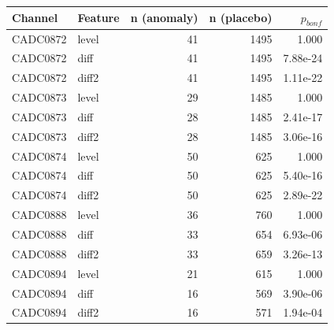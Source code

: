 \begin{tabular}{llrrr}
\toprule
Channel & Feature & n (anomaly) & n (placebo) & $p_{bonf}$ \\
\midrule
CADC0872 & level & 41 & 1495 & 1.000 \\
CADC0872 & diff & 41 & 1495 & 7.88e-24 \\
CADC0872 & diff2 & 41 & 1495 & 1.11e-22 \\
CADC0873 & level & 29 & 1485 & 1.000 \\
CADC0873 & diff & 28 & 1485 & 2.41e-17 \\
CADC0873 & diff2 & 28 & 1485 & 3.06e-16 \\
CADC0874 & level & 50 & 625 & 1.000 \\
CADC0874 & diff & 50 & 625 & 5.40e-16 \\
CADC0874 & diff2 & 50 & 625 & 2.89e-22 \\
CADC0888 & level & 36 & 760 & 1.000 \\
CADC0888 & diff & 33 & 654 & 6.93e-06 \\
CADC0888 & diff2 & 33 & 659 & 3.26e-13 \\
CADC0894 & level & 21 & 615 & 1.000 \\
CADC0894 & diff & 16 & 569 & 3.90e-06 \\
CADC0894 & diff2 & 16 & 571 & 1.94e-04 \\
\bottomrule
\end{tabular}
